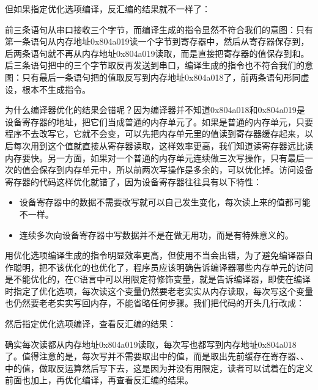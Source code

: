 但如果指定优化选项编译，反汇编的结果就不一样了：




前三条语句从串口接收三个字节，而编译生成的指令显然不符合我们的意图：只有第一条语句从内存地址0x804a019读一个字节到寄存器中，然后从寄存器保存到，后两条语句就不再从内存地址0x804a019读取，而是直接把寄存器的值保存到和。后三条语句把中的三个字节取反再发送到串口，编译生成的指令也不符合我们的意图：只有最后一条语句把的值取反写到内存地址0x804a018了，前两条语句形同虚设，根本不生成指令。



为什么编译器优化的结果会错呢？因为编译器并不知道0x804a018和0x804a019是设备寄存器的地址，把它们当成普通的内存单元了。如果是普通的内存单元，只要程序不去改写它，它就不会变，可以先把内存单元里的值读到寄存器缓存起来，以后每次用到这个值就直接从寄存器读取，这样效率更高，我们知道读寄存器远比读内存要快。另一方面，如果对一个普通的内存单元连续做三次写操作，只有最后一次的值会保存到内存单元中，所以前两次写操作是多余的，可以优化掉。访问设备寄存器的代码这样优化就错了，因为设备寄存器往往具有以下特性：


\begin{itemize}

\item 设备寄存器中的数据不需要改写就可以自己发生变化，每次读上来的值都可能不一样。

\item 连续多次向设备寄存器中写数据并不是在做无用功，而是有特殊意义的。
\end{itemize}


用优化选项编译生成的指令明显效率更高，但使用不当会出错，为了避免编译器自作聪明，把不该优化的也优化了，程序员应该明确告诉编译器哪些内存单元的访问是不能优化的，在C语言中可以用限定符修饰变量，就是告诉编译器，即使在编译时指定了优化选项，每次读这个变量仍然要老老实实从内存读取，每次写这个变量也仍然要老老实实写回内存，不能省略任何步骤。我们把代码的开头几行改成：




然后指定优化选项编译，查看反汇编的结果：




确实每次读都从内存地址0x804a019读取，每次写也都写到内存地址0x804a018了。值得注意的是，每次写并不需要取出中的值，而是取出先前缓存在寄存器、、中的值，做取反运算然后写下去，这是因为并没有用限定，读者可以试着在的定义前面也加上，再优化编译，再查看反汇编的结果。



